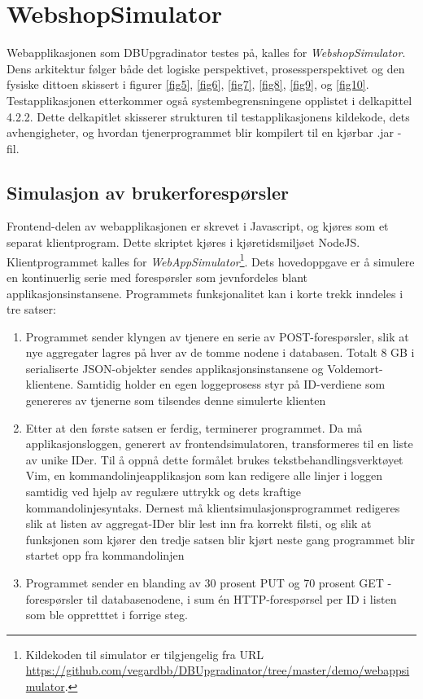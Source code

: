 \section{WebshopSimulator} \label{prog}

Webapplikasjonen som DBUpgradinator testes på, kalles for \emph{WebshopSimulator}. Dens arkitektur følger både det logiske perspektivet, prosess\-perspektivet og den fysiske dittoen skissert i figurer \ref{fig5}, \ref{fig6}, \ref{fig7}, \ref{fig8}, \ref{fig9}, og \ref{fig10}. Testapplikasjonen etterkommer også systembegrensningene opplistet i delkapittel 4.2.2. Dette delkapitlet skisserer strukturen til testapplikasjonens kildekode, dets avhengigheter, og hvordan tjenerprogrammet blir kompilert til en kjørbar .jar - fil.

\subsection{Simulasjon av brukerforespørsler}

Frontend-delen av webapplikasjonen er skrevet i Javascript, og kjøres som et separat klientprogram. Dette skriptet kjøres i kjøretidsmiljøet NodeJS. Klientprogrammet kalles for \emph{WebAppSimulator}\footnote{Kildekoden til simulator er tilgjengelig fra URL \url{https://github.com/vegardbb/DBUpgradinator/tree/master/demo/webappsimulator}.}. Dets hovedoppgave er å simulere en kontinuerlig serie med forespørsler som jevnfordeles blant applikasjonsinstansene. Programmets funksjonalitet kan i korte trekk inndeles i tre satser:

\begin{enumerate}
  \item Programmet sender klyngen av tjenere en serie av POST-forespørsler, slik at nye aggregater lagres på hver av de tomme nodene i databasen. Totalt 8 GB i serialiserte JSON-objekter sendes applikasjonsinstansene og Voldemort-klientene. Samtidig holder en egen loggeprosess styr på ID-verdiene som genereres av tjenerne som tilsendes denne simulerte klienten
  \item Etter at den første satsen er ferdig, terminerer programmet. Da må applikasjonsloggen, generert av frontendsimulatoren, transformeres til en liste av unike IDer. Til å oppnå dette formålet brukes tekstbehandlingsverktøyet Vim, en kommandolinjeapplikasjon som kan redigere alle linjer i loggen samtidig ved hjelp av regulære uttrykk og dets kraftige kommandolinjesyntaks. Dernest må klientsimulasjonsprogrammet redigeres slik at listen av aggregat-IDer blir lest inn fra korrekt filsti, og slik at funksjonen som kjører den tredje satsen blir kjørt neste gang programmet blir startet opp fra kommandolinjen
  \item Programmet sender en blanding av 30 prosent PUT og 70 prosent GET - forespørsler til databasenodene, i sum én HTTP-forespørsel per ID i listen som ble oppretttet i forrige steg.
\end{enumerate}

